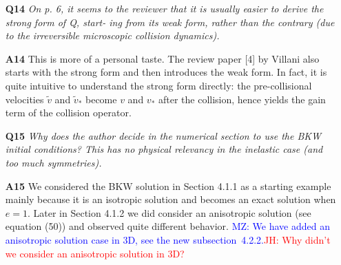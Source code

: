 \documentclass[11pt]{article}
\newcommand{\jh}[1]{\textcolor{red}{JH: #1}}
\newcommand{\mz}[1]{\textcolor{blue}{MZ: #1}}
\begin{document}
\begin{itemize}
\item[{\bf Q14}] {\it On p. 6, it seems to the reviewer that it is usually easier to derive the strong form of Q, start- ing from its weak form, rather than the contrary (due to the irreversible microscopic collision dynamics).}

\item[{\bf A14}] This is more of a personal taste. The review paper [4] by Villani also starts with the strong form and then introduces the weak form. In fact, it is quite intuitive to understand the strong form directly: the pre-collisional velocities $\tilde{v}$ and $\tilde{v}_*$ become $v$ and $v_*$ after the collision, hence yields the gain term of the collision operator.


\item[{\bf Q15}] {\it Why does the author decide in the numerical section to use the BKW initial conditions? This has no physical relevancy in the inelastic case (and too much symmetries).}

\item[{\bf A15}] We considered the BKW solution in Section 4.1.1 as a starting example mainly because it is an isotropic solution and becomes an exact solution when $e=1$. Later in Section 4.1.2 we did consider an anisotropic solution (see equation (50)) and observed quite different behavior. \mz{We have added an anisotropic solution case in 3D, see the new subsection~4.2.2.}\jh{Why didn't we consider an anisotropic solution in 3D?}



\end{itemize}
\end{document}
